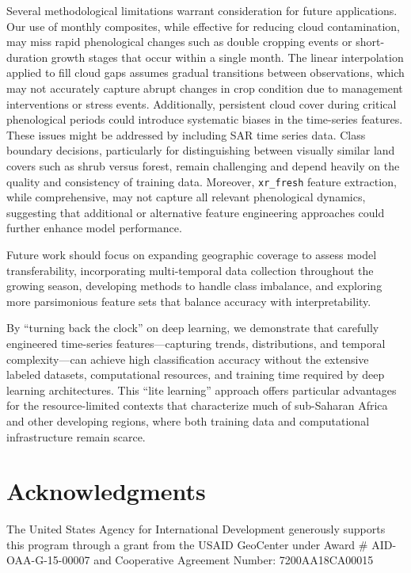 \documentclass[
  journal,
  twocolumn]{IEEEtran}
\begin{document}
Several methodological limitations warrant consideration for future
applications. Our use of monthly composites, while effective for
reducing cloud contamination, may miss rapid phenological changes such
as double cropping events or short-duration growth stages that occur
within a single month. The linear interpolation applied to fill cloud
gaps assumes gradual transitions between observations, which may not
accurately capture abrupt changes in crop condition due to management
interventions or stress events. Additionally, persistent cloud cover
during critical phenological periods could introduce systematic biases
in the time-series features. These issues might be addressed by
including SAR time series data. Class boundary decisions, particularly
for distinguishing between visually similar land covers such as shrub
versus forest, remain challenging and depend heavily on the quality and
consistency of training data. Moreover, \texttt{xr\_fresh} feature
extraction, while comprehensive, may not capture all relevant
phenological dynamics, suggesting that additional or alternative feature
engineering approaches could further enhance model performance.

Future work should focus on expanding geographic coverage to assess
model transferability, incorporating multi-temporal data collection
throughout the growing season, developing methods to handle class
imbalance, and exploring more parsimonious feature sets that balance
accuracy with interpretability.

By ``turning back the clock'' on deep learning, we demonstrate that
carefully engineered time-series features---capturing trends,
distributions, and temporal complexity---can achieve high classification
accuracy without the extensive labeled datasets, computational
resources, and training time required by deep learning architectures.
This ``lite learning'' approach offers particular advantages for the
resource-limited contexts that characterize much of sub-Saharan Africa
and other developing regions, where both training data and computational
infrastructure remain scarce.

\newpage

\section{Acknowledgments}\label{acknowledgments}

The United States Agency for International Development generously
supports this program through a grant from the USAID GeoCenter under
Award \# AID-OAA-G-15-00007 and Cooperative Agreement Number:
7200AA18CA00015

\renewcommand\refname{References}
  
\end{document}
